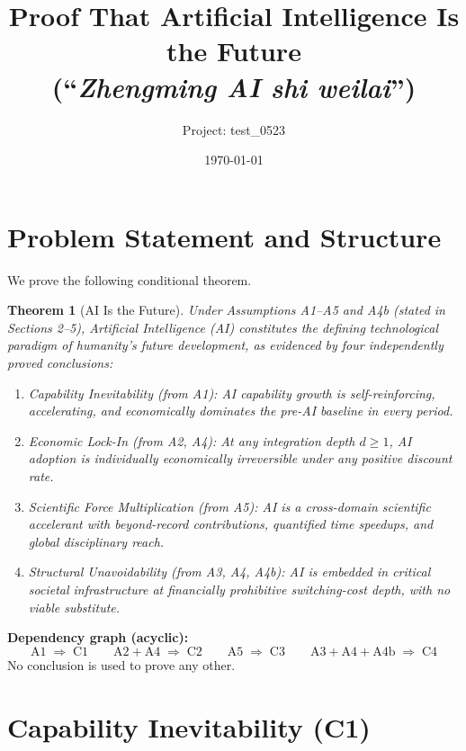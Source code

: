 \documentclass[12pt]{article}
\title{\textbf{Proof That Artificial Intelligence Is the Future}\\[4pt]
  \large (``\emph{Zhengming AI shi weilai}'')}
\author{Project: test\_0523}
\date{\today}
\newtheorem{theorem}{Theorem}[section]
\begin{document}
\maketitle
\tableofcontents
\newpage

\section{Problem Statement and Structure}

We prove the following conditional theorem.

\begin{theorem}[AI Is the Future]\label{thm:main}
  Under Assumptions A1--A5 and A4b (stated in Sections 2--5), Artificial
  Intelligence (AI) constitutes the defining technological paradigm of
  humanity's future development, as evidenced by four independently
  proved conclusions:
  \begin{enumerate}
    \item[(C1)] \emph{Capability Inevitability} (from A1):
      AI capability growth is self-reinforcing, accelerating, and
      economically dominates the pre-AI baseline in every period.
    \item[(C2)] \emph{Economic Lock-In} (from A2, A4):
      At any integration depth $d \geq 1$, AI adoption is individually
      economically irreversible under any positive discount rate.
    \item[(C3)] \emph{Scientific Force Multiplication} (from A5):
      AI is a cross-domain scientific accelerant with beyond-record
      contributions, quantified time speedups, and global disciplinary
      reach.
    \item[(C4)] \emph{Structural Unavoidability} (from A3, A4, A4b):
      AI is embedded in critical societal infrastructure at financially
      prohibitive switching-cost depth, with no viable substitute.
  \end{enumerate}
\end{theorem}

\textbf{Dependency graph (acyclic):}
\[
\text{A1} \;\Rightarrow\; \text{C1}
\qquad
\text{A2}+\text{A4} \;\Rightarrow\; \text{C2}
\qquad
\text{A5} \;\Rightarrow\; \text{C3}
\qquad
\text{A3}+\text{A4}+\text{A4b} \;\Rightarrow\; \text{C4}
\]
No conclusion is used to prove any other.

\newpage
\section{Capability Inevitability (C1)}
\end{document}
